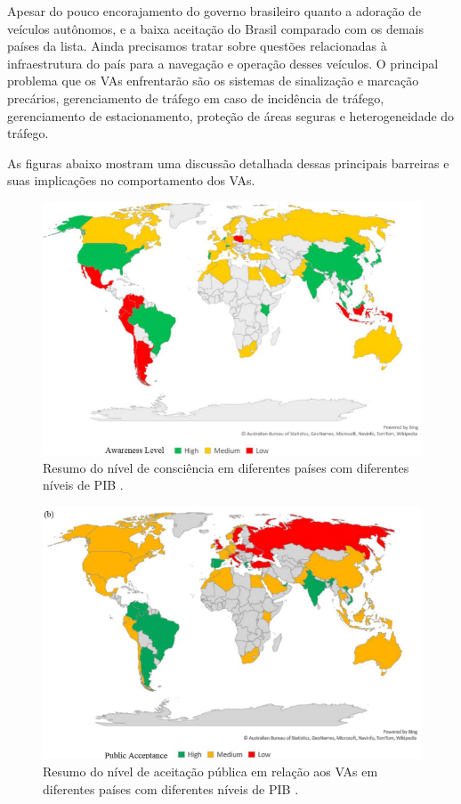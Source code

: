 Apesar do pouco encorajamento do governo brasileiro quanto a adoração de veículos autônomos, e a baixa aceitação do Brasil comparado com os demais países da lista. Ainda precisamos tratar sobre questões relacionadas à infraestrutura do país para a navegação e operação desses veículos. 
O principal problema que os VAs enfrentarão são os sistemas de sinalização e marcação precários, gerenciamento de tráfego em caso de incidência de tráfego, gerenciamento de estacionamento, proteção de áreas seguras e heterogeneidade do tráfego.

As figuras abaixo mostram uma discussão detalhada dessas principais barreiras e suas implicações no comportamento dos VAs.
\begin{figure}[H]
\centering
\includegraphics[width=12cm]{Figures/grafik-a.png}
\caption{ Resumo do nível de consciência em diferentes países com diferentes níveis de PIB \cite{mundobrasil}.}
\label{awareness}
\end{figure}
\begin{figure}[H]
\centering
\includegraphics[width=12cm]{Figures/grafik-b.png}
\caption{ Resumo do nível de aceitação pública em relação aos VAs em diferentes países com diferentes níveis de PIB \cite{mundobrasil}.}
\label{public}
\end{figure}


